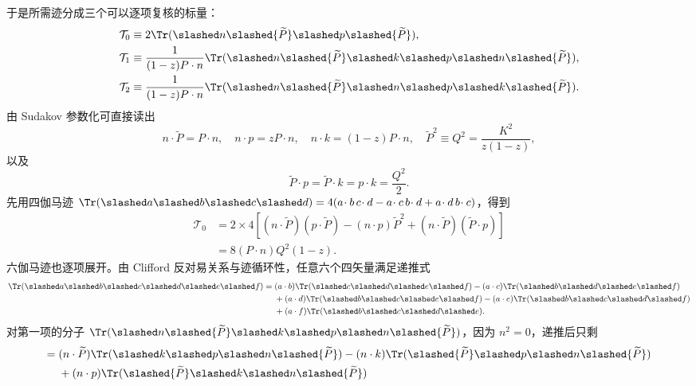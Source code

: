 \begin{derivation}[夸克共线发射的分裂概率]
于是所需迹分成三个可以逐项复核的标量：
\begin{align*}
\mathcal T_0
&\equiv2\Tr(\slashed n\slashed{\widetilde P}\slashed p\slashed{\widetilde P}),\\
\mathcal T_1
&\equiv\frac{1}{(1-z)P\cdot n}
\Tr(\slashed n\slashed{\widetilde P}\slashed k\slashed p
\slashed n\slashed{\widetilde P}),\\
\mathcal T_2
&\equiv\frac{1}{(1-z)P\cdot n}
\Tr(\slashed n\slashed{\widetilde P}\slashed n\slashed p
\slashed k\slashed{\widetilde P}).
\end{align*}
由 Sudakov 参数化可直接读出
\begin{equation*}
 n\cdot\widetilde P=P\cdot n,
 \quad n\cdot p=zP\cdot n,
 \quad n\cdot k=(1-z)P\cdot n,
 \quad \widetilde P^2\equiv Q^2=\frac{K^2}{z(1-z)},
\end{equation*}
以及
\begin{equation*}
 \widetilde P\cdot p
 =\widetilde P\cdot k
 =p\cdot k=\frac{Q^2}{2}.
\end{equation*}
先用四伽马迹
$\Tr(\slashed a\slashed b\slashed c\slashed d)
=4(a\!\cdot b\,c\!\cdot d-a\!\cdot c\,b\!\cdot d+a\!\cdot d\,b\!\cdot c)$，得到
\begin{align*}
\mathcal T_0
&=2\times4\left[
 (n\cdot\widetilde P)(p\cdot\widetilde P)
 -(n\cdot p)\widetilde P^2
 +(n\cdot\widetilde P)(\widetilde P\cdot p)
 \right]\\
&=8(P\cdot n)Q^2(1-z).
\end{align*}
六伽马迹也逐项展开。由 Clifford 反对易关系与迹循环性，任意六个四矢量满足递推式
\begin{align*}
\Tr(\slashed a\slashed b\slashed c\slashed d\slashed e\slashed f)
={}&(a\cdot b)\Tr(\slashed c\slashed d\slashed e\slashed f)
-(a\cdot c)\Tr(\slashed b\slashed d\slashed e\slashed f)\\
&+(a\cdot d)\Tr(\slashed b\slashed c\slashed e\slashed f)
-(a\cdot e)\Tr(\slashed b\slashed c\slashed d\slashed f)\\
&+(a\cdot f)\Tr(\slashed b\slashed c\slashed d\slashed e).
\end{align*}
对第一项的分子
\(\Tr(\slashed n\slashed{\widetilde P}\slashed k\slashed p
\slashed n\slashed{\widetilde P})\)，因为 $n^2=0$，递推后只剩
\begin{align*}
={}&(n\cdot\widetilde P)\Tr(\slashed k\slashed p\slashed n\slashed{\widetilde P})
-(n\cdot k)\Tr(\slashed{\widetilde P}\slashed p\slashed n\slashed{\widetilde P})\\
&+(n\cdot p)\Tr(\slashed{\widetilde P}\slashed k\slashed n\slashed{\widetilde P})

\end{align*}
\end{derivation}
